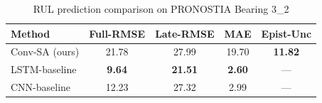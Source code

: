 \begin{table}[h]
\centering
\caption{RUL prediction comparison on PRONOSTIA Bearing 3\_2}
\label{tab:rul_comparison}
\begin{tabular}{lcccc}
\toprule
Method & Full-RMSE & Late-RMSE & MAE & Epist-Unc \\
\midrule
Conv-SA (ours) & 21.78 & 27.99 & 19.70 & \textbf{11.82} \\
LSTM-baseline & \textbf{9.64} & \textbf{21.51} & \textbf{2.60} & — \\
CNN-baseline & 12.23 & 27.32 & 2.99 & — \\
\bottomrule
\end{tabular}
\end{table}

